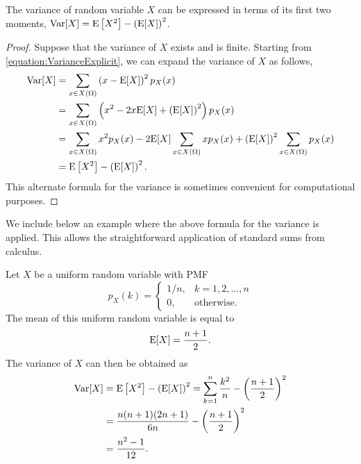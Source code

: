 \begin{proposition}
The variance of random variable $X$ can be expressed in terms of its first two moments,
$\mathrm{Var} [X] = \mathrm{E} \left[ X^2 \right] - \left( \mathrm{E} [X] \right)^2$.
\end{proposition}
\begin{proof}
Suppose that the variance of $X$ exists and is finite.
Starting from \eqref{equation:VarianceExplicit}, we can expand the variance of $X$ as follows,
\begin{equation*}
\begin{split}
\mathrm{Var} [X] &= \sum_{x \in X(\Omega)} \left( x - \mathrm{E} [X] \right)^2 p_X (x) \\
&= \sum_{x \in X(\Omega)} \left( x^2 - 2 x \mathrm{E} [X] + \left( \mathrm{E} [X] \right)^2 \right) p_X (x) \\
&= \sum_{x \in X(\Omega)} x^2 p_X (x) - 2 \mathrm{E} [X] \sum_{x \in X(\Omega)} x p_X (x) + \left( \mathrm{E} [X] \right)^2 \sum_{x \in X(\Omega)} p_X (x) \\
&= \mathrm{E} \left[ X^2 \right] - \left( \mathrm{E} [X] \right)^2.
\end{split}
\end{equation*}
This alternate formula for the variance is sometimes convenient for computational purposes.
\end{proof}

We include below an example where the above formula for the variance is applied.
This allows the straightforward application of standard sums from calculus.

\begin{example}
Let $X$ be a uniform random variable with PMF
\begin{equation*}
p_X (k) = \begin{cases}
1/n, & k = 1, 2, \ldots, n \\
0, & \text{otherwise} .
\end{cases}
\end{equation*}
The mean of this uniform random variable is equal to
\begin{equation*}
\mathrm{E} [X] = \frac{n+1}{2} .
\end{equation*}
The variance of $X$ can then be obtained as
\begin{equation*}
\begin{split}
\mathrm{Var} [X] &= \mathrm{E} \left[ X^2 \right] - \left( \mathrm{E} [X] \right)^2
= \sum_{k=1}^n \frac{k^2}{n} - \left( \frac{n+1}{2} \right)^2 \\
&= \frac{n(n+1)(2n+1)}{6n} - \left( \frac{n+1}{2} \right)^2 \\
&= \frac{n^2 - 1}{12} .
\end{split}
\end{equation*}
\end{example}

